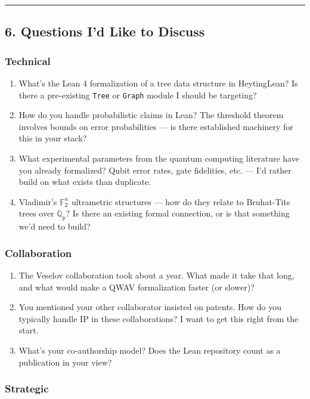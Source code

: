 \documentclass[11pt,a4paper]{article}
\begin{document}
\bigskip
\noindent\rule{\textwidth}{0.4pt}
\bigskip
\subsection*{6. Questions I'd Like to Discuss}

\subsubsection*{Technical}

\begin{enumerate}[nosep]
\item What's the Lean 4 formalization of a tree data structure in HeytingLean? Is there a pre-existing \texttt{Tree} or \texttt{Graph} module I should be targeting?
\item How do you handle probabilistic claims in Lean? The threshold theorem involves bounds on error probabilities — is there established machinery for this in your stack?
\item What experimental parameters from the quantum computing literature have you already formalized? Qubit error rates, gate fidelities, etc. — I'd rather build on what exists than duplicate.
\item Vladimir's $\mathbb{F}_2^n$ ultrametric structures — how do they relate to Bruhat-Tits trees over $\mathbb{Q}_p$? Is there an existing formal connection, or is that something we'd need to build?
\end{enumerate}

\subsubsection*{Collaboration}

\begin{enumerate}[nosep]
\item The Veselov collaboration took about a year. What made it take that long, and what would make a QWAV formalization faster (or slower)?
\item You mentioned your other collaborator insisted on patents. How do you typically handle IP in these collaborations? I want to get this right from the start.
\item What's your co-authorship model? Does the Lean repository count as a publication in your view?
\end{enumerate}

\subsubsection*{Strategic}
\end{document}
